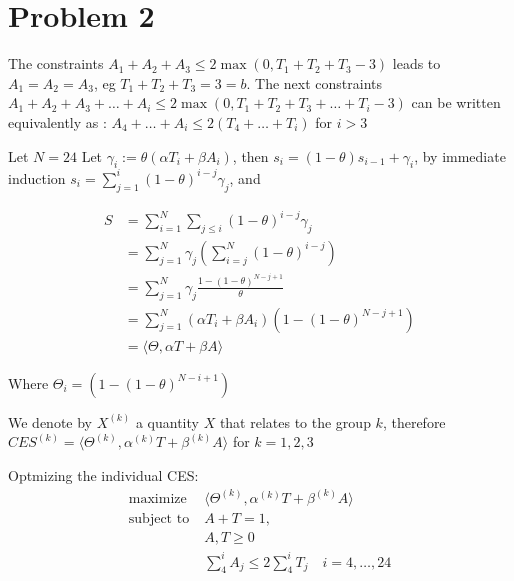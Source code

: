 \documentclass[11pt]{article}
\begin{document}
\section{Problem 2}
\label{sec:orgheadline3}

The constraints \(A_1+A_2+A_3 \le 2 \max(0, T_1+T_2+T_3 - 3)\) leads to \(A_1 = A_2 = A_3\), eg \(T_1 + T_2 + T_3 = 3 = b\).
The next constraints \(A_1 + A_2 + A_3 + \ldots  + A_i \le 2\max(0, T_1 + T_2 + T_3 + \ldots + T_i- 3)\) can be written equivalently as : \(A_4 + \ldots + A_i \le 2(T_4 + \ldots + T_i)\) for \(i > 3\)


Let \(N = 24\)
Let \(\gamma_i := \theta(\alpha T_i + \beta A_i)\), then \(s_i = (1-\theta)s_{i-1} + \gamma_i\), by immediate induction \(s_i = \sum_{j=1}^i (1-\theta)^{i-j} \gamma_j\),
and

\begin{align*}S &= \sum_{i=1}^{N} \sum_{j \le i} (1-\theta)^{i-j} \gamma_j
\\&= \sum_{j=1}^N \gamma_j (\sum_{i=j}^N(1-\theta)^{i-j})
\\&= \sum_{j=1}^N \gamma_j \frac{1 - (1-\theta)^{N-j+1}}{\theta} 
\\&= \sum_{j=1}^N (\alpha T_i + \beta A_i) (1 - (1-\theta)^{N-j+1})
\\&= \langle \Theta, \alpha T + \beta A \rangle
\end{align*}

Where \(\Theta_i = (1 - (1-\theta)^{N-i+1})\)

We denote by \(X^{(k)}\) a quantity \(X\) that relates to the group \(k\), therefore \(CES^{(k)} = \langle \Theta^{(k)}, \alpha^{(k)} T + \beta^{(k)} A \rangle\) for \(k = 1, 2, 3\)

Optmizing the individual CES:
  \begin{align}
  \text{maximize} \; & \langle \Theta^{(k)}, \alpha^{(k)} T + \beta^{(k)} A \rangle \\
  \text{subject to} \; & A + T = 1,
    \\& A, T \ge 0
    \\& \sum_4^i A_j \le  2 \sum_4^i T_j \quad i = 4, \ldots, 24
\end{align}
\end{document}
